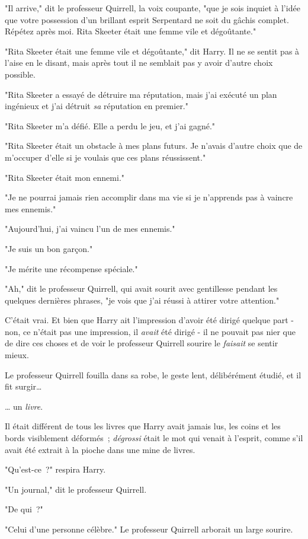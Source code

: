 "Il arrive," dit le professeur Quirrell, la voix coupante, "que je sois inquiet à l'idée que votre possession d'un brillant esprit Serpentard ne soit du gâchis complet. Répétez après moi. Rita Skeeter était une femme vile et dégoûtante."

"Rita Skeeter était une femme vile et dégoûtante," dit Harry. Il ne se sentit pas à l'aise en le disant, mais après tout il ne semblait pas y avoir d'autre choix possible.

"Rita Skeeter a essayé de détruire ma réputation, mais j'ai exécuté un plan ingénieux et j'ai détruit \emph{sa} réputation en premier."

"Rita Skeeter m'a défié. Elle a perdu le jeu, et j'ai gagné."

"Rita Skeeter était un obstacle à mes plans futurs. Je n'avais d'autre choix que de m'occuper d'elle si je voulais que ces plans réussissent."

"Rita Skeeter était mon ennemi."

"Je ne pourrai jamais rien accomplir dans ma vie si je n'apprends pas à vaincre mes ennemis."

"Aujourd'hui, j'ai vaincu l'un de mes ennemis."

"Je suis un bon garçon."

"Je mérite une récompense spéciale."

"Ah," dit le professeur Quirrell, qui avait sourit avec gentillesse pendant les quelques dernières phrases, "je vois que j'ai réussi à attirer votre attention."

C'était vrai. Et bien que Harry ait l'impression d'avoir été dirigé quelque part - non, ce n'était pas une impression, il \emph{avait} été dirigé - il ne pouvait pas nier que de dire ces choses et de voir le professeur Quirrell sourire le \emph{faisait} se sentir mieux.

Le professeur Quirrell fouilla dans sa robe, le geste lent, délibérément étudié, et il fit surgir…

… un \emph{livre}.

Il était différent de tous les livres que Harry avait jamais lus, les coins et les bords visiblement déformés~; \emph{dégrossi} était le mot qui venait à l'esprit, comme s'il avait été extrait à la pioche dans une mine de livres.

"Qu'est-ce~?" respira Harry.

"Un journal," dit le professeur Quirrell.

"De qui~?"

"Celui d'une personne célèbre." Le professeur Quirrell arborait un large sourire.

